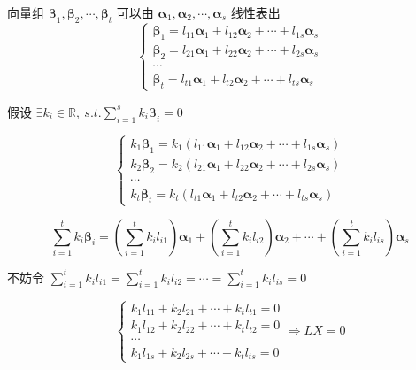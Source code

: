 \begin{theorem}[判别线性相关性的七大定理]
\begin{anymark}[证明]
		向量组 $\boldsymbol{\beta}_{1},\boldsymbol{\beta}_{2},\cdots,\boldsymbol{\beta}_{t}$ 可以由 $\boldsymbol{\alpha}_{1},\boldsymbol{\alpha}_{2},\cdots,\boldsymbol{\alpha}_{s}$ 线性表出  
		$$\begin{cases}
		    \boldsymbol{\beta}_{1}=l_{11}\boldsymbol{\alpha}_{1}+l_{12}\boldsymbol{\alpha}_{2}+\cdots+l_{1s}\boldsymbol{\alpha}_{s}\\
			\boldsymbol{\beta}_{2}=l_{21}\boldsymbol{\alpha}_{1}+l_{22}\boldsymbol{\alpha}_{2}+\cdots+l_{2s}\boldsymbol{\alpha}_{s}\\
			\cdots\\
			\boldsymbol{\beta}_{t}=l_{t1}\boldsymbol{\alpha}_{1}+l_{t2}\boldsymbol{\alpha}_{2}+\cdots+l_{ts}\boldsymbol{\alpha}_{s}
		\end{cases}$$

		假设 $\exists k_{i}\in \mathbb{R},\ s.t. \sum\limits_{i=1}^{s}k_{i}\boldsymbol{\beta}_{i} = 0$
		
		$$\begin{cases}
		  k_{1}\boldsymbol{\beta}_{1} = k_{1}(l_{11}\boldsymbol{\alpha}_{1}+l_{12}\boldsymbol{\alpha}_{2}+\cdots+l_{1s}\boldsymbol{\alpha}_{s})\\
		  k_{2}\boldsymbol{\beta}_{2} = k_{2}(l_{21}\boldsymbol{\alpha}_{1}+l_{22}\boldsymbol{\alpha}_{2}+\cdots+l_{2s}\boldsymbol{\alpha}_{s})\\
		  \cdots\\
		  k_{t}\boldsymbol{\beta}_{t} = k_{t}(l_{t1}\boldsymbol{\alpha}_{1}+l_{t2}\boldsymbol{\alpha}_{2}+\cdots+l_{ts}\boldsymbol{\alpha}_{s})
		\end{cases}$$
		
		$$
		\sum_{i=1}^{t}k_{i}\boldsymbol{\beta}_{i} = (\sum\limits_{i=1}^{t}k_{i}l_{i1})\boldsymbol{\alpha}_{1}+(\sum\limits_{i=1}^{t}k_{i}l_{i2})\boldsymbol{\alpha}_{2}+\cdots+(\sum\limits_{i=1}^{t}k_{i}l_{is})\boldsymbol{\alpha}_{s}
		$$
		
		不妨令 $\sum\limits_{i=1}^{t}k_{i}l_{i1} = \sum\limits_{i=1}^{t}k_{i}l_{i2} = \cdots = \sum\limits_{i=1}^{t}k_{i}l_{is} = 0$

		$$\begin{cases}
		  k_{1}l_{11} + k_{2}l_{21} + \cdots + k_{t}l_{t1} = 0\\
		  k_{1}l_{12} + k_{2}l_{22} + \cdots + k_{t}l_{t2} = 0\\
		  \cdots\\
		  k_{1}l_{1s} + k_{2}l_{2s} + \cdots + k_{t}l_{ts} = 0
		\end{cases}\Rightarrow 
		LX = 0$$


\end{anymark}
\end{theorem}
